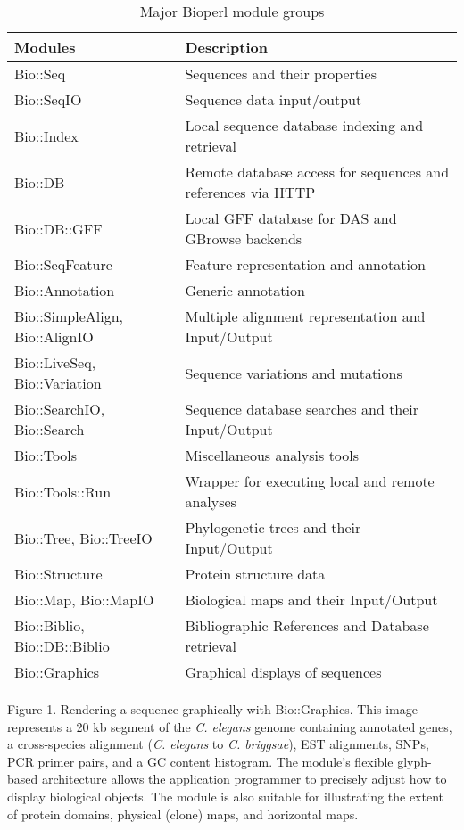 \documentclass[12pt]{article}
\begin{document}
\begin{table}[h]
\begin{tabular}{|l|l|}
\hline
\textbf{Modules} & \textbf{Description} \\
\hline
Bio::Seq &  Sequences and their properties \\
Bio::SeqIO & Sequence data input/output \\
Bio::Index & Local sequence database indexing and retrieval \\ 
Bio::DB & Remote database access for sequences and references via HTTP \\
Bio::DB::GFF & Local GFF database for DAS and GBrowse backends \\
Bio::SeqFeature & Feature representation and annotation \\
Bio::Annotation & Generic annotation \\
Bio::SimpleAlign, Bio::AlignIO  & Multiple alignment representation
and Input/Output \\
Bio::LiveSeq, Bio::Variation & Sequence variations and mutations \\
Bio::SearchIO, Bio::Search  & Sequence database searches and their Input/Output \\
Bio::Tools &  Miscellaneous analysis tools \\
Bio::Tools::Run &  Wrapper for executing local and remote analyses \\
Bio::Tree, Bio::TreeIO & Phylogenetic trees and their Input/Output  \\
Bio::Structure & Protein structure data \\
Bio::Map, Bio::MapIO & Biological maps and their Input/Output \\
Bio::Biblio, Bio::DB::Biblio & Bibliographic References and Database
retrieval \\ 
Bio::Graphics & Graphical displays of sequences \\
\hline
\end{tabular}
\caption{Major Bioperl module groups}
\label{tab:modules}
\end{table}

\newpage


Figure 1.  Rendering a sequence graphically with Bio::Graphics.  This
image represents a 20 kb segment of the \textit{C. elegans} genome
containing annotated genes, a cross-species alignment
(\textit{C. elegans} to \textit{C. briggsae}), EST alignments, SNPs,
PCR primer pairs, and a GC content histogram.  The module's flexible
glyph-based architecture allows the application programmer to
precisely adjust how to display biological objects.  The module is
also suitable for illustrating the extent of protein domains, physical
(clone) maps, and horizontal maps.
\end{document}
